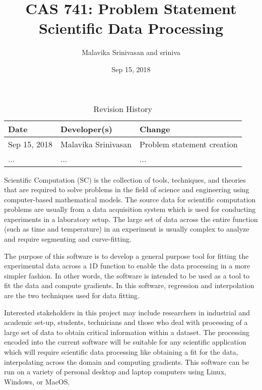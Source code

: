 \documentclass{article}
\title{CAS 741: Problem Statement\\ Scientific Data Processing}
\author{Malavika Srinivasan and sriniva}
\date{Sep 15, 2018}
\begin{document}
\maketitle

\begin{table}[hp]
\caption{Revision History} \label{TblRevisionHistory}
\begin{tabularx}{\textwidth}{llX}
\toprule
\textbf{Date} & \textbf{Developer(s)} & \textbf{Change}\\
\midrule
Sep 15, 2018 & Malavika Srinivasan & Problem statement creation\\
... & ... & ...\\
\bottomrule
\end{tabularx}
\end{table}

Scientific Computation (SC) is the collection of tools, techniques, and
theories that are required to solve problems in the field of science and
engineering using computer-based mathematical models. The source data for
scientific computation problems are usually from a data acquisition system
which is used for conducting experiments in a laboratory setup. The large set
of data across the entire function (such as time and temperature) in an
experiment is usually complex to analyze and require segmenting and
curve-fitting.

The purpose of this software is to develop a general purpose tool for fitting
the experimental data across a 1D function to enable the data processing in a
more simpler fashion. In other words, the software is intended to be used as a
tool to fit the data and compute gradients. In this software, regression and
interpolation are the two techniques used for data fitting.

Interested stakeholders in this project may include researchers in industrial
and academic set-up, students, technicians and those who deal with processing
of a large set of data to obtain critical information within a dataset. The
processing encoded into the current software will be suitable for any
scientific application which will require scientific data processing like
obtaining a fit for the data, interpolating across the domain and computing
gradients. This software can be run on a variety of personal desktop and laptop
computers using Linux, Windows, or MacOS.





\end{document}
